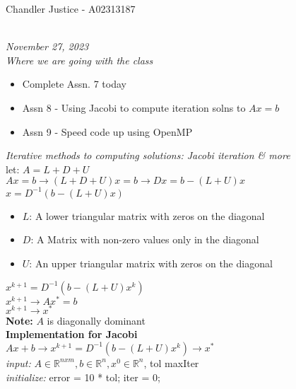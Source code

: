 \documentclass[10pt, AMS Euler]{article}
\newcommand{\R}{\mathbb{R}}
\begin{document}
\begin{flushright}
Chandler Justice - A02313187
\end{flushright}
\noindent \underline{\hspace{3in}}\\
\textit{November 27, 2023}\\
\textit{Where we are going with the class}
\begin{itemize}
  \item Complete Assn. 7 today
  \item Assn 8 - Using Jacobi to compute iteration solns to $Ax =b$
  \item Assn 9 - Speed code up using OpenMP
\end{itemize}

\textit{Iterative methods to computing solutions: Jacobi iteration \& more}\\
let: $A = L + D + U$\\
$Ax = b \rightarrow (L + D + U) x = b \rightarrow Dx = b - (L + U)x$\\
$x = D^{-1}(b- (L + U) x)$\\
\begin{itemize}
  \item $L$: A lower triangular matrix with zeros on the diagonal
  \item $D$: A Matrix with non-zero values only in the diagonal
  \item $U$: An upper triangular matrix with zeros on the diagonal
\end{itemize}
$x^{k+1} = D^{-1} (b - (L + U)x^k)$\\
$x^{k+1} \rightarrow Ax^* = b$\\
$x^{k+1} \rightarrow x^*$\\
\textbf{Note:} $A$ is diagonally dominant\\

\textbf{Implementation for Jacobi}\\
$Ax + b \rightarrow x^{k+1} = D^{-1}(b - (L + U)x^k) \rightarrow x^*$\\
\textit{input:} $A \in \R^{n x m}, b \in \R^n, x^0 \in \R^n$, tol maxIter\\
\textit{initialize:} error = 10 * tol; iter = 0;\\
\end{document}
